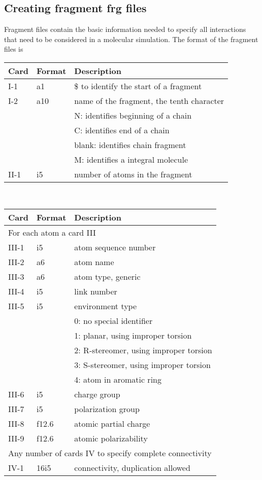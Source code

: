\subsection{Creating fragment {\bf frg} files}
Fragment files contain the basic information needed to specify all
interactions that need to be considered in a molecular simulation.
The format of the fragment files is
\begin{center}
\begin{tabular}{lll}
\hline\hline
Card & Format & Description \\ \hline
I-1  & a1     & \$ to identify the start of a fragment \\
I-2  & a10    & name of the fragment, the tenth character\\
     &        & N: identifies beginning of a chain\\
     &        & C: identifies end of a chain\\
     &        & blank: identifies chain fragment\\
     &        & M: identifies a integral molecule\\
II-1 & i5     & number of atoms in the fragment\\ 
\hline
\end{tabular}\\
\begin{tabular}{lll}
\hline\hline
Card & Format & Description \\ \hline
\multicolumn{3}{l}{For each atom a card III} \\
III-1 & i5     & atom sequence number \\
III-2 & a6     & atom name \\
III-3 & a6     & atom type, generic \\
III-4 & i5     & link number\\
III-5 & i5     & environment type\\
      &        & 0: no special identifier\\
      &        & 1: planar, using improper torsion\\
      &        & 2: R-stereomer, using improper torsion\\
      &        & 3: S-stereomer, using improper torsion\\
      &        & 4: atom in aromatic ring\\
III-6 & i5     & charge group\\
III-7 & i5     & polarization group\\
III-8 & f12.6  & atomic partial charge\\
III-9 & f12.6  & atomic polarizability\\
\multicolumn{3}{l}{Any number of cards IV to specify complete 
connectivity} \\
IV-1  & 16i5   & connectivity, duplication allowed\\ 
\hline\hline
\end{tabular}
\end{center}
